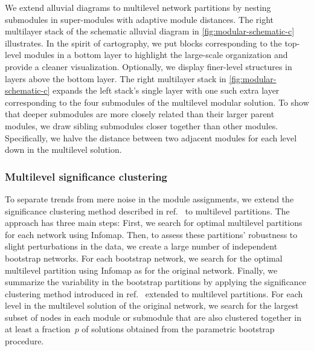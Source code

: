\documentclass[aps,rmp,floats,floatfix,twocolumn,superscriptaddress,final]{revtex4-2}
\begin{document}
We extend alluvial diagrams to multilevel network partitions by nesting submodules in super-modules with adaptive module distances.
The right multilayer stack of the schematic alluvial diagram in \cref{fig:modular-schematic-c} illustrates. 
In the spirit of cartography, we put blocks corresponding to the top-level modules in a bottom layer to highlight the large-scale organization and provide a cleaner visualization.
Optionally, we display finer-level structures in layers above the bottom layer.
The right multilayer stack in \cref{fig:modular-schematic-c} expands the left stack's single layer with one such extra layer corresponding to the four submodules of the multilevel modular solution. 
To show that deeper submodules are more closely related than their larger parent modules, we draw sibling submodules closer together than other modules.
Specifically, we halve the distance between two adjacent modules for each level down in the multilevel solution.

\subsubsection*{Multilevel significance clustering}
\label{sec:sigclu}

To separate trends from mere noise in the module assignments, we extend the significance clustering method described in ref.~ to multilevel partitions.
The approach has three main steps:
First, we search for optimal multilevel partitions for each network using Infomap.
Then, to assess these partitions' robustness to slight perturbations in the data, we create a large number of independent bootstrap networks.
For each bootstrap network, we search for the optimal multilevel partition using Infomap as for the original network.
Finally, we summarize the variability in the bootstrap partitions by applying the significance clustering method introduced in ref.~ extended to multilevel partitions.
For each level in the multilevel solution of the original network, we search for the largest subset of nodes in each module or submodule that are also clustered together in at least a fraction~$p$ of solutions obtained from the parametric bootstrap procedure.
\end{document}
